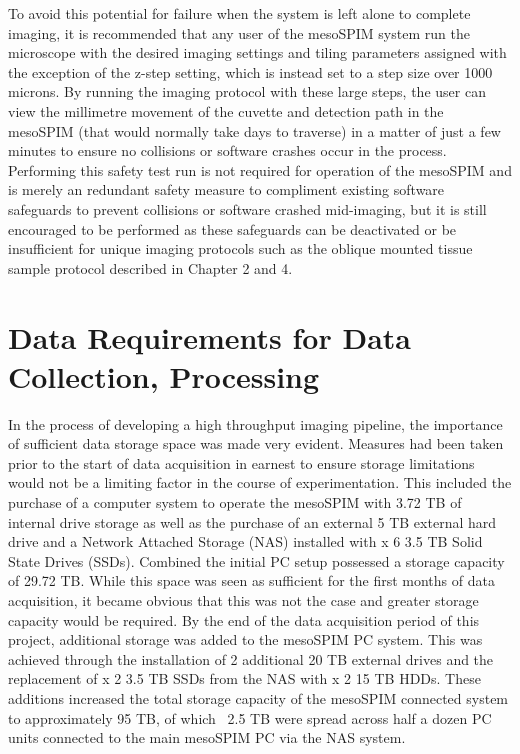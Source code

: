 To avoid this potential for failure when the system is left alone to complete imaging, it is recommended that any user of the mesoSPIM system run the microscope with the desired imaging settings and tiling parameters assigned with the exception of the z-step setting, which is instead set to a step size over 1000 microns. By running the imaging protocol with these large steps, the user can view the millimetre movement of the cuvette and detection path in the mesoSPIM (that would normally take days to traverse) in a matter of just a few minutes to ensure no collisions or software crashes occur in the process. Performing this safety test run is not required for operation of the mesoSPIM and is merely an redundant safety measure to compliment existing software safeguards to prevent collisions or software crashed mid-imaging, but it is still encouraged to be performed as these safeguards can be deactivated or be insufficient for unique imaging protocols such as the oblique mounted tissue sample protocol described in Chapter 2 and 4.  

\section{Data Requirements for Data Collection, Processing}

In the process of developing a high throughput imaging pipeline, the importance of sufficient data storage space was made very evident. Measures had been taken prior to the start of data acquisition in earnest to ensure storage limitations would not be a limiting factor in the course of experimentation. This included the purchase of a computer system to operate the mesoSPIM with 3.72 TB of internal drive storage as well as the purchase of an external 5 TB external hard drive and a Network Attached Storage (NAS) installed with x 6 3.5 TB Solid State Drives (SSDs). Combined the initial PC setup possessed a storage capacity of 29.72 TB. While this space was seen as sufficient for the first months of data acquisition, it became obvious that this was not the case and greater storage capacity would be required. By the end of the data acquisition period of this project, additional storage was added to the mesoSPIM PC system. This was achieved through the installation of 2 additional 20 TB external drives and the replacement of x 2 3.5 TB SSDs from the NAS with x 2 15 TB HDDs. These additions increased the total storage capacity of the mesoSPIM connected system to approximately 95 TB, of which ~2.5 TB were spread across half a dozen PC units connected to the main mesoSPIM PC via the NAS system. 


